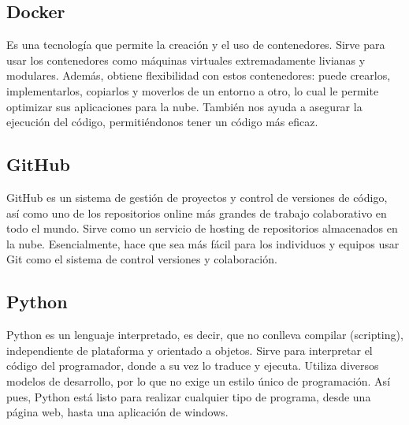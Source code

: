\documentclass[12pt,letterpaper]{article}
\begin{document}
\subsection*{Docker}
Es una tecnología que permite la creación y el uso de contenedores.  Sirve para usar los
contenedores como máquinas virtuales extremadamente livianas y modulares.  Además, obtiene
flexibilidad con estos contenedores: puede crearlos, implementarlos, copiarlos y moverlos de un
entorno a otro, lo cual le permite optimizar sus aplicaciones para la nube.
\citep{redhat_docker}
También nos ayuda a asegurar la ejecución del código, permitiéndonos tener un código más eficaz.

\subsection*{GitHub}
GitHub es un sistema de gestión de proyectos y control de versiones de código, así como uno de los
repositorios online más grandes de trabajo colaborativo en todo el mundo.
\citep{hostinger_tutoriales_2019}
Sirve como un servicio de hosting de repositorios almacenados en la nube. Esencialmente, hace que
sea más fácil para los individuos y equipos usar Git como el sistema de control versiones y
colaboración.
\citep{kinsta_2020}

\subsection*{Python}
Python es un lenguaje interpretado, es decir, que no conlleva compilar (scripting), independiente de
plataforma y orientado a objetos. 
\citep{desarrollo_web_2003}
Sirve para interpretar el código del programador, donde a su vez lo traduce y ejecuta. Utiliza
diversos modelos de desarrollo, por lo que no exige un estilo único de programación.
\citep{angeles_2020}
Así pues, Python está listo para realizar cualquier tipo de programa, desde una página web, hasta
una aplicación de windows.
\end{document}
